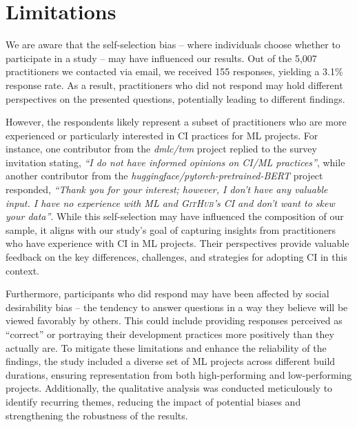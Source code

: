 \section{Limitations}
\label{sec:limitations}


We are aware that the self-selection bias -- 
 where individuals choose whether to participate in a study -- may have influenced our results.
Out of the 5,007 practitioners we contacted via email, we received 155 responses, yielding a 3.1\% response rate. As a result, practitioners who did not respond may hold different perspectives on the presented questions, potentially leading to different findings.

However, the respondents likely represent a subset of practitioners who are more experienced or particularly interested in CI practices for ML projects. For instance, one contributor from the \textit{dmlc/tvm} project replied to the survey invitation stating, \textit{``I do not have informed opinions on CI/ML practices''}, while another contributor from the \textit{huggingface/pytorch-pretrained-BERT} project responded, \textit{``Thank you for your interest; however, I don't have any valuable input. I have no experience with ML and \textsc{GitHub}'s CI and don't want to skew your data''}. 
While this self-selection may have influenced the composition of our sample, it aligns with our study’s goal of capturing insights from practitioners who have experience with CI in ML projects. Their perspectives provide valuable feedback on the key differences, challenges, and strategies for adopting CI in this context.

Furthermore, participants who did respond may have been affected by social desirability bias -- the tendency to answer questions in a way they believe will be viewed favorably by others. This could include providing responses perceived as ``correct'' or portraying their development practices more positively than they actually are. To mitigate these limitations and enhance the reliability of the findings, the study included a diverse set of ML projects across different build durations, ensuring representation from both high-performing and low-performing projects. Additionally, the qualitative analysis was conducted meticulously to identify recurring themes, reducing the impact of potential biases and strengthening the robustness of the results.

